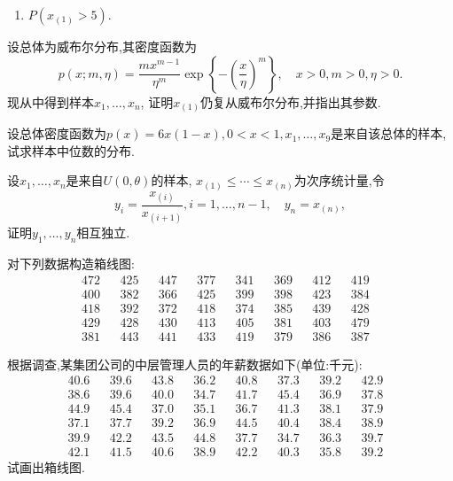 \begin{xiti}
\begin{enumerate}
\item $P(x_{(1)}>5)$.
\end{enumerate}
\item 设总体为威布尔分布,其密度函数为
\[p(x;m,\eta)=\frac{mx^{m-1}}{\eta^m}\exp\left\{ -\left( \frac{x}{\eta} \right) ^m \right\},\quad x>0,m>0,\eta>0.\]
现从中得到样本$x_1,\dotsc,x_n$, 证明$x_{(1)}$仍复从威布尔分布,并指出其参数.
\item 设总体密度函数为$p(x)=6x(1-x),0<x<1,x_1,\dotsc,x_9$是来自该总体的样本,试求样本中位数的分布.
\item 设$x_1,\dotsc,x_n$是来自$U(0,\theta)$的样本, $x_{(1)}\leq\dotsb\leq x_{(n)}$为次序统计量,令
\[y_i=\frac{x_{(i)}}{x_{(i+1)}},i=1,\dotsc,n-1,\quad y_n=x_{(n)},\]
证明$y_1,\dotsc,y_n$相互独立.
\item 对下列数据构造箱线图:
\begin{align*}
472&&425&&447&&377&&341&&369&&412&&419&\\
400&&382&&366&&425&&399&&398&&423&&384&\\
418&&392&&372&&418&&374&&385&&439&&428&\\
429&&428&&430&&413&&405&&381&&403&&479&\\
381&&443&&441&&433&&419&&379&&386&&387&
\end{align*}
\item 根据调查,某集团公司的中层管理人员的年薪数据如下(单位:千元):
\begin{align*}
40.6&&39.6&&43.8&&36.2&&40.8&&37.3&&39.2&&42.9&\\
38.6&&39.6&&40.0&&34.7&&41.7&&45.4&&36.9&&37.8&\\
44.9&&45.4&&37.0&&35.1&&36.7&&41.3&&38.1&&37.9&\\
37.1&&37.7&&39.2&&36.9&&44.5&&40.4&&38.4&&38.9&\\
39.9&&42.2&&43.5&&44.8&&37.7&&34.7&&36.3&&39.7&\\
42.1&&41.5&&40.6&&38.9&&42.2&&40.3&&35.8&&39.2&
\end{align*}
试画出箱线图.
\end{xiti}
